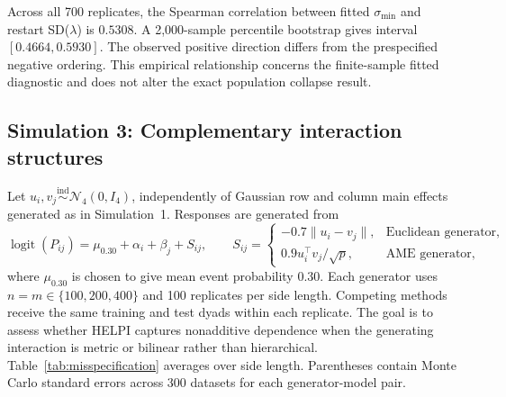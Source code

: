 \documentclass[
  12pt]{article}
\theoremstyle{definition}
\theoremstyle{plain}
\newcommand{\Normal}{\mathcal N}
\DeclareMathOperator{\logit}{logit}
\begin{document}
Across all 700 replicates, the Spearman correlation between fitted $\sigma_{\min}$ and restart SD($\lambda$) is $0.5308$. A 2,000-sample percentile bootstrap gives interval $[0.4664,0.5930]$. The observed positive direction differs from the prespecified negative ordering. This empirical relationship concerns the finite-sample fitted diagnostic and does not alter the exact population collapse result.

\subsection{Simulation 3: Complementary interaction structures}
\label{supp:misspec-results}

Let $u_i,v_j\stackrel{\mathrm{ind}}\sim\Normal_4(0,I_4)$, independently of Gaussian row and column main effects generated as in Simulation~1. Responses are generated from
\[
\logit(P_{ij})=\mu_{0.30}+\alpha_i+\beta_j+S_{ij},
\qquad
S_{ij}=
\begin{cases}
	-0.7\|u_i-v_j\|, & \text{Euclidean generator},\\
	0.9u_i^\top v_j/\sqrt p, & \text{AME generator},
\end{cases}
\]
where $\mu_{0.30}$ is chosen to give mean event probability $0.30$. Each generator uses $n=m\in\{100,200,400\}$ and 100 replicates per side length. Competing methods receive the same training and test dyads within each replicate. The goal is to assess whether HELPI captures nonadditive dependence when the generating interaction is metric or bilinear rather than hierarchical. Table~\ref{tab:misspecification} averages over side length. Parentheses contain Monte Carlo standard errors across 300 datasets for each generator-model pair.
\end{document}
